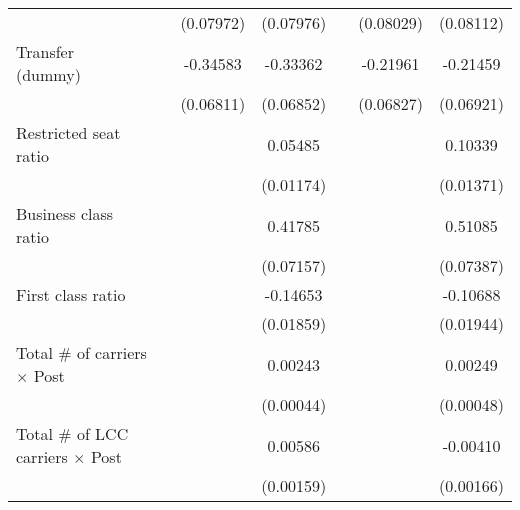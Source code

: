 \begin{table}[htbp]
\begin{tabular}{l*{6}{c}}
                    &                     &   (0.07972)         &   (0.07976)         &                     &   (0.08029)         &   (0.08112)         \\
\addlinespace
\shortstack{Transfer \\ (dummy)}&                     &    -0.34583\sym{***}&    -0.33362\sym{***}&                     &    -0.21961\sym{***}&    -0.21459\sym{***}\\
                    &                     &   (0.06811)         &   (0.06852)         &                     &   (0.06827)         &   (0.06921)         \\
\addlinespace
Restricted seat ratio&                     &                     &     0.05485\sym{***}&                     &                     &     0.10339\sym{***}\\
                    &                     &                     &   (0.01174)         &                     &                     &   (0.01371)         \\
\addlinespace
Business class ratio&                     &                     &     0.41785\sym{***}&                     &                     &     0.51085\sym{***}\\
                    &                     &                     &   (0.07157)         &                     &                     &   (0.07387)         \\
\addlinespace
First class ratio   &                     &                     &    -0.14653\sym{***}&                     &                     &    -0.10688\sym{***}\\
                    &                     &                     &   (0.01859)         &                     &                     &   (0.01944)         \\
\addlinespace
Total # of carriers $\times$ Post&                     &                     &     0.00243\sym{***}&                     &                     &     0.00249\sym{***}\\
                    &                     &                     &   (0.00044)         &                     &                     &   (0.00048)         \\
\addlinespace
Total # of LCC carriers $\times$ Post&                     &                     &     0.00586\sym{***}&                     &                     &    -0.00410\sym{**} \\
                    &                     &                     &   (0.00159)         &                     &                     &   (0.00166)         \\

\end{tabular}
\end{table}
